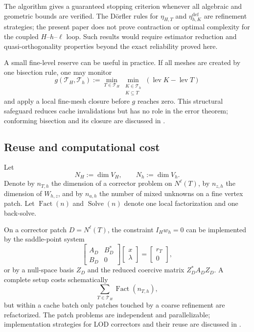 The algorithm gives a guaranteed stopping criterion whenever all
algebraic and geometric bounds are verified.  The D\"orfler rules for
$\eta_{H,T}$ and $\eta_{h,K}^{\mathrm{def}}$ are refinement strategies;
the present paper does not prove contraction or optimal complexity for
the coupled $H$--$h$--$\ell$ loop.  Such results would require estimator
reduction and quasi-orthogonality properties beyond the exact reliability
proved here.

A small fine-level reserve can be useful in practice.  If all meshes are
created by one bisection rule, one may monitor
\[
  g(\mathcal T_H,\mathcal T_h)
  :=\min_{T\in\mathcal T_H}
    \min_{\substack{K\in\mathcal T_h\\K\subseteq T}}
    (\operatorname{lev}K-\operatorname{lev}T)
\]
and apply a local fine-mesh closure before $g$ reaches zero.  This
structural safeguard reduces cache invalidations but has no role in the
error theorem; conforming bisection and its closure are discussed in
\cite{Stevenson2008}.

\subsection{Reuse and computational cost}
\label{sec:computational-realization}

Let
\[
  N_H:=\dim V_H,
  \qquad N_h:=\dim V_h.
\]
Denote by $n_{T,h}$ the dimension of a corrector problem on
$N^\ell(T)$, by $n_{z,h}$ the dimension of $W_{h,z}$, and by $n_{a,h}$
the number of mixed unknowns on a fine vertex patch.  Let
$\operatorname{Fact}(n)$ and $\operatorname{Solve}(n)$ denote one local
factorization and one back-solve.

On a corrector patch $D=N^\ell(T)$, the constraint $I_Hw_h=0$ can be
implemented by the saddle-point system
\begin{equation}
\label{eq:corrector-saddle-point}
  \begin{bmatrix}
    A_D&B_D^*\\ B_D&0
  \end{bmatrix}
  \begin{bmatrix}x\\\lambda\end{bmatrix}
  =\begin{bmatrix}r_T\\0\end{bmatrix},
\end{equation}
or by a null-space basis $Z_D$ and the reduced coercive matrix
$Z_D^*A_DZ_D$.  A complete setup costs schematically
\begin{equation}
\label{eq:corrector-cost}
  \sum_{T\in\mathcal T_H}\operatorname{Fact}(n_{T,h}),
\end{equation}
but within a cache batch only patches touched by a coarse refinement are
refactorized.  The patch problems are independent and parallelizable;
implementation strategies for LOD correctors and their reuse are discussed
in \cite{EngwerHenningMalqvistPeterseim2019}.

